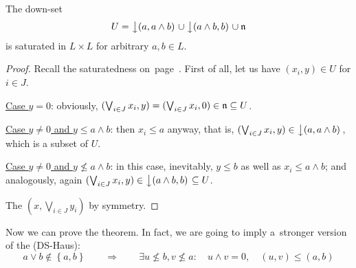 \begin{lem} \label{downsets-satur}
  The down-set
  \[
    U = \left\downarrow(a, a \wedge b)\right. \cup \left\downarrow(a \wedge b, b)\right. \cup \mathfrak{n}
  \]
  is saturated in $L \times L$ for arbitrary $a, b\in L$.
\end{lem}
\begin{proof}
  Recall the saturatedness on~page~\pageref{df:satur}\thinspace.
  First of all, let us have $(x_i, y)\in U$ for $i\in J$.

  \underline{Case $y = 0$}:
  obviously, $(\bigvee_{i\in J} x_i, y) = (\bigvee_{i\in J} x_i, 0)\in \mathfrak{n}
  \subseteq U$.

  \underline{Case $y \ne 0$ and $y \leq a \wedge b$}:
  then $x_i \leq a$ anyway, that is, $(\bigvee_{i\in J} x_i, y) \in
  \left\downarrow(a, a \wedge b)\right.$, which is a subset of $U$.

  \underline{Case $y \ne 0$ and $y \not\leq a \wedge b$}:
  in this case, inevitably, $y \leq b$ as well as $x_i \leq a \wedge b$; and
  analogously, again $(\bigvee_{i\in J} x_i, y) \in \left\downarrow(a \wedge b,
  b)\right. \subseteq U$.

  The $(x, \bigvee_{i\in J} y_i)$ by symmetry.
\end{proof}

Now we can prove the theorem.
In fact, we are going to imply a~stronger version of the (DS-Haus):
\[
  a \vee b \not\in \left\{a, b\right\} \qquad \Rightarrow \qquad \exists
  u\not\leq b, v\not\leq a: \quad u \wedge v = 0, \quad \boxed{\left(u,
  v\right) \leq \left(a, b\right)}
\]

